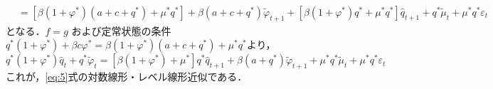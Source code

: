 \documentclass[dvipdfmx]{jlreq}
\begin{document}
\begin{itemize}
\begin{equation}
\begin{split}
        &= [\beta(1+\varphi^*)(a+c+q^*) + \mu^* q^*] + \beta(a+c+q^*) \widetilde{\varphi}_{t+1} + [\beta(1+\varphi^*)q^* + \mu^* q^*] \widehat{q}_{t+1} + q^* \widetilde{\mu}_t + \mu^* q^* \varepsilon_t
      \end{split}
    \end{equation}
    となる．$f=g$ および定常状態の条件$q^*(1+\varphi^*) + \beta c \varphi^* = \beta(1+\varphi^*)(a+c+q^*) + \mu^* q^*$より，
    \begin{equation}
      q^*(1+\varphi^*) \widehat{q}_t + q^* \widetilde{\varphi}_t = [\beta(1+\varphi^*) + \mu^*] q^* \widehat{q}_{t+1} + \beta(a+q^*) \widetilde{\varphi}_{t+1} + \mu^* q^* \widetilde{\mu}_t + \mu^* q^* \varepsilon_t
    \end{equation}
    これが，\eqref{eq:5}式の対数線形・レベル線形近似である．


\end{itemize}
\end{document}
